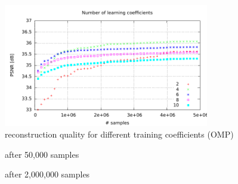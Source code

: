\begin{figure}[h]
\centering
\includegraphics[width = 0.8\textwidth]{../tests/results/old/coeffsConverg.pdf}
\caption{reconstruction quality for different training coefficients (OMP)}
\label{fig:coeffsOMP}
\end{figure}



\begin{figure}[H]
\centering
{}
\hspace{15mm}
\caption{after 50,000 samples}
\label{fig:coeffsOMP50}
\end{figure}
\begin{figure}[H]
\centering
{}
\hspace{15mm}
\caption{after 2,000,000 samples}
\label{fig:coeffsOMP2000}
\end{figure}


